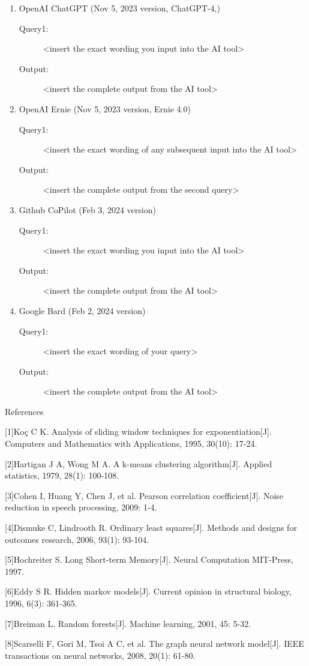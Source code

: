 \documentclass{mcmthesis}
\begin{document}
\begin{enumerate}   %
\item OpenAI ChatGPT (Nov 5, 2023 version, ChatGPT-4,)  %
\begin{description}     %
\item[Query1:] <insert the exact wording you input into the AI tool> 
\item[Output:] <insert the complete output from the AI tool>
\end{description}
\item OpenAI Ernie (Nov 5, 2023 version, Ernie 4.0) 
\begin{description}
\item[Query1:] <insert the exact wording of any subsequent input into the AI tool> 
\item[Output:] <insert the complete output from the second query>
\end{description}
\item Github CoPilot (Feb 3, 2024 version) 
\begin{description}
\item[Query1:] <insert the exact wording you input into the AI tool> 
\item[Output:] <insert the complete output from the AI tool>
\end{description}
\item Google Bard (Feb 2, 2024 version) 
\begin{description}
\item[Query1:] <insert the exact wording of your query> 
\item[Output:] <insert the complete output from the AI tool>
\end{description}
\end{enumerate}

{\LARGE References}

[1]Koç C K. Analysis of sliding window techniques for exponentiation[J]. Computers and Mathematics with Applications, 1995, 30(10): 17-24.

[2]Hartigan J A, Wong M A. A k-means clustering algorithm[J]. Applied statistics, 1979, 28(1): 100-108.

[3]Cohen I, Huang Y, Chen J, et al. Pearson correlation coefficient[J]. Noise reduction in speech processing, 2009: 1-4.

[4]Dismuke C, Lindrooth R. Ordinary least squares[J]. Methods and designs for outcomes research, 2006, 93(1): 93-104.

[5]Hochreiter S. Long Short-term Memory[J]. Neural Computation MIT-Press, 1997.

[6]Eddy S R. Hidden markov models[J]. Current opinion in structural biology, 1996, 6(3): 361-365.

[7]Breiman L. Random forests[J]. Machine learning, 2001, 45: 5-32.

[8]Scarselli F, Gori M, Tsoi A C, et al. The graph neural network model[J]. IEEE transactions on neural networks, 2008, 20(1): 61-80.
\end{document}
